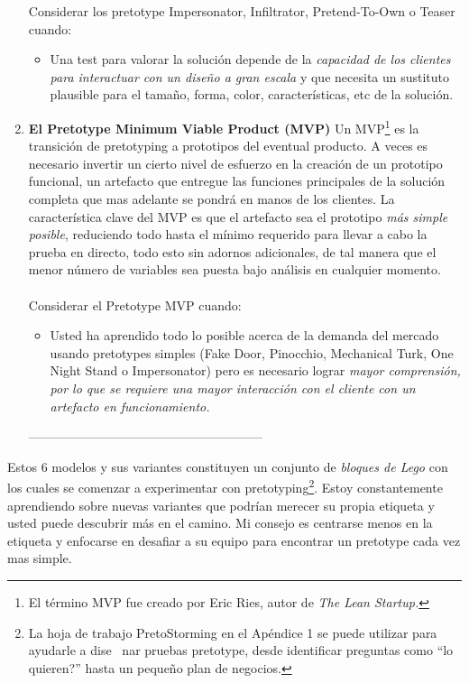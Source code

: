 \documentclass{article}
\begin{document}
\begin{enumerate}
\begin{itemize}
\end{itemize}

Considerar los pretotype Impersonator, Infiltrator, Pretend-To-Own o Teaser cuando:

\begin{itemize}
\item Una test para valorar la soluci\'on depende de la \textit{capacidad de los clientes para interactuar con un dise\~no a gran escala} y que necesita un sustituto plausible para el tama\~no, forma, color, caracter\'isticas, etc de la soluci\'on.
\end{itemize}


\item \textbf{El Pretotype Minimum Viable Product (MVP)}
Un MVP\footnote{El t\'ermino MVP fue creado por Eric Ries, autor de \textit{The Lean Startup.}} es la transici\'on de pretotyping a prototipos del eventual producto. A veces es necesario invertir un cierto nivel de esfuerzo en la creaci\'on de un prototipo funcional, un artefacto que entregue las funciones principales de la soluci\'on completa que mas adelante se pondr\'a en manos de los clientes. La caracter\'istica clave del MVP es que el artefacto sea el prototipo \textit{m\'as simple posible}, reduciendo todo hasta el m\'inimo requerido para llevar a cabo la prueba en directo, todo esto sin adornos adicionales, de tal manera que el menor n\'umero de variables sea puesta bajo an\'alisis en cualquier momento.
\\ \\
Considerar el Pretotype MVP cuando:

\begin{itemize}
\item Usted ha aprendido todo lo posible acerca de la demanda del mercado usando pretotypes simples (Fake Door, Pinocchio, Mechanical Turk, One Night Stand o Impersonator) pero es necesario lograr \textit{mayor comprensi\'on, por lo que se requiere una mayor interacci\'on con el cliente con un artefacto en funcionamiento.}
\end{itemize}

\centerline{--------------------------------------------------------}

\end{enumerate}

Estos 6 modelos y sus variantes constituyen un conjunto de \textit{bloques de Lego} con los cuales se comenzar a experimentar con pretotyping\footnote{La hoja de trabajo PretoStorming en el Ap\'endice 1 se puede utilizar para ayudarle a dise	~nar pruebas pretotype, desde identificar preguntas como ``lo quieren?'' hasta un peque\~no plan de negocios.}. Estoy constantemente aprendiendo sobre nuevas variantes que podr\'ian merecer su propia etiqueta y usted puede descubrir m\'as en el camino. Mi consejo es centrarse menos en la etiqueta y enfocarse en desafiar a su equipo para encontrar un pretotype cada vez mas simple.
\end{document}
